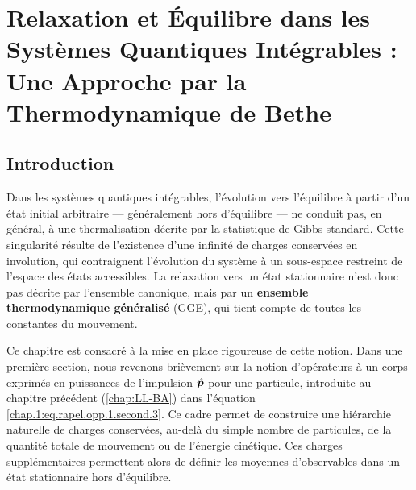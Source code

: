 \chapter{Relaxation et Équilibre dans les Systèmes Quantiques Intégrables : Une Approche par la Thermodynamique de Bethe}\label{chap:relaxation}
\minitoc

\section*{Introduction}


Dans les systèmes quantiques intégrables, l'évolution vers l'équilibre à partir d'un état initial arbitraire — généralement hors d'équilibre — ne conduit pas, en général, à une thermalisation décrite par la statistique de Gibbs standard.  
Cette singularité résulte de l'existence d'une infinité de charges conservées en involution, qui contraignent l'évolution du système à un sous-espace restreint de l'espace des états accessibles.  
La relaxation vers un état stationnaire n'est donc pas décrite par l'ensemble canonique, mais par un \textbf{ensemble thermodynamique généralisé} (GGE), qui tient compte de toutes les constantes du mouvement.

\medskip

Ce chapitre est consacré à la mise en place rigoureuse de cette notion.  
Dans une première section, nous revenons brièvement sur la notion d’opérateurs à un corps exprimés en puissances de l’impulsion $\hat{\bm{p}}$ pour une particule, introduite au chapitre précédent (\ref{chap:LL-BA}) dans l’équation \eqref{chap.1:eq.rapel.opp.1.second.3}.  
Ce cadre permet de construire une hiérarchie naturelle de charges conservées, au-delà du simple nombre de particules, de la quantité totale de mouvement ou de l’énergie cinétique.  
Ces charges supplémentaires permettent alors de définir les moyennes d'observables dans un état stationnaire hors d'équilibre.

